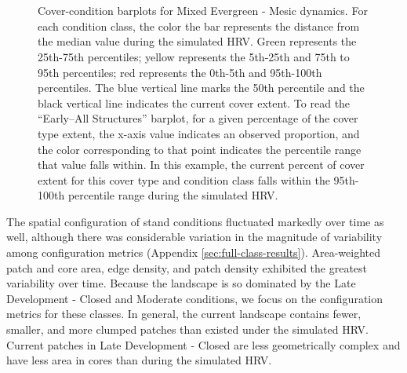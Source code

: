 \begin{figure}[!htbp]
  \\%
  \\%
    \\%
    \\%
    \\%
    \\%
    \\%
  \caption{Cover-condition barplots for Mixed Evergreen - Mesic dynamics. For each condition class, the color the bar represents the distance from the median value during the simulated HRV. Green represents the 25th-75th percentiles; yellow represents the 5th-25th and 75th to 95th percentiles; red represents the 0th-5th and 95th-100th percentiles. The blue vertical line marks the 50th percentile and the black vertical line indicates the current cover extent. To read the ``Early–All Structures'' barplot, for a given percentage of the cover type extent, the x-axis value indicates an observed proportion, and the color corresponding to that point indicates the percentile range that value falls within. In this example, the current percent of cover extent for this cover type and condition class falls within the 95th-100th percentile range during the simulated HRV.}
  \label{fig:covcondbar_megm}
\end{figure}

The spatial configuration of stand conditions fluctuated markedly over time as well, although there was considerable variation in the magnitude of variability among configuration metrics (Appendix \ref{sec:full-class-results}). Area-weighted patch and core area, edge density, and patch density exhibited the greatest variability over time. Because the landscape is so dominated by the Late Development - Closed and Moderate conditions, we focus on the configuration metrics for these classes. In general, the current landscape contains fewer, smaller, and more clumped patches than existed under the simulated HRV. Current patches in Late Development - Closed are less geometrically complex and have less area in cores than during the simulated HRV.


